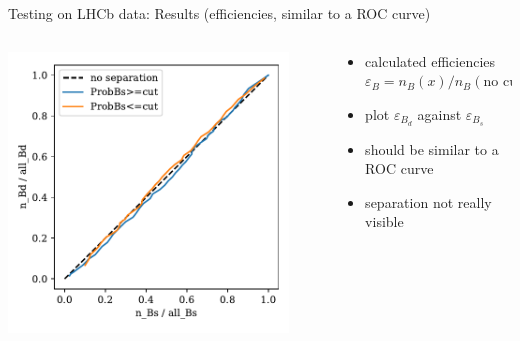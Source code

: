 \documentclass[aspectratio=1610, 10pt]{beamer}
\begin{document}
\begin{frame}{Testing on LHCb data: Results (efficiencies, similar to a ROC curve)}
  \begin{columns}
    \begin{column}{0.5\textwidth}
      \centering
      \includegraphics[width=0.9\textwidth]{images/data_roc_new.pdf}
    \end{column}
    \begin{column}{0.5\textwidth}
      \begin{itemize}
        \item calculated efficiencies $\varepsilon_B = n_B(x)/n_B(\text{no cut})$
        \item plot $\varepsilon_{B_d}$ against $\varepsilon_{B_s}$
        \item should be similar to a ROC curve
        \item separation not really visible
      \end{itemize}
    \end{column}
  \end{columns}
\end{frame}
\end{document}
